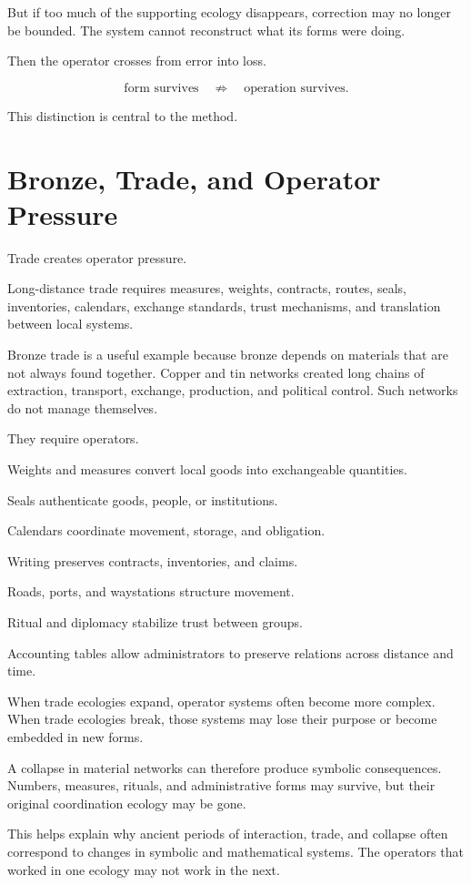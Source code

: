\documentclass[11pt]{book}
\begin{document}
But if too much of the supporting ecology disappears, correction may no longer be bounded. The system cannot reconstruct what its forms were doing.

Then the operator crosses from error into loss.

\[
\text{form survives}
\quad \not\Rightarrow \quad
\text{operation survives}.
\]

This distinction is central to the method.

\section{Bronze, Trade, and Operator Pressure}

Trade creates operator pressure.

Long-distance trade requires measures, weights, contracts, routes, seals, inventories, calendars, exchange standards, trust mechanisms, and translation between local systems.

Bronze trade is a useful example because bronze depends on materials that are not always found together. Copper and tin networks created long chains of extraction, transport, exchange, production, and political control. Such networks do not manage themselves.

They require operators.

Weights and measures convert local goods into exchangeable quantities.

Seals authenticate goods, people, or institutions.

Calendars coordinate movement, storage, and obligation.

Writing preserves contracts, inventories, and claims.

Roads, ports, and waystations structure movement.

Ritual and diplomacy stabilize trust between groups.

Accounting tables allow administrators to preserve relations across distance and time.

When trade ecologies expand, operator systems often become more complex. When trade ecologies break, those systems may lose their purpose or become embedded in new forms.

A collapse in material networks can therefore produce symbolic consequences. Numbers, measures, rituals, and administrative forms may survive, but their original coordination ecology may be gone.

This helps explain why ancient periods of interaction, trade, and collapse often correspond to changes in symbolic and mathematical systems. The operators that worked in one ecology may not work in the next.
\end{document}
